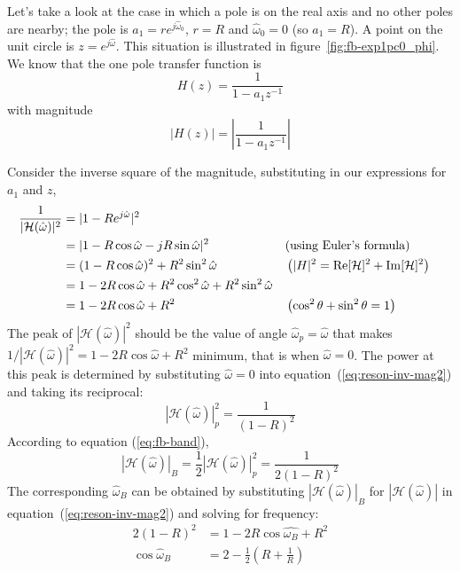 Let's take a look at the case in which a pole is on the real axis and
no other poles are nearby; the pole is $a_1=re^{j\hat{\omega}_0}$,
$r=R$ and $\hat{\omega}_0=0$ (so $a_1=R$). A point on the unit circle
is $z=e^{j\hat{\omega}}$. This situation is illustrated in
figure~\ref{fig:fb-exp1pc0_phi}.  We know that the one pole transfer
function is
\begin{equation}
H(z)=\frac{1}{1-a_1z^{-1}}
\end{equation}
with magnitude 
\begin{equation}
|H(z)|=\left|\frac{1}{1-a_1z^{-1}}\right|
\end{equation}

Consider the inverse square of the magnitude, substituting in our
expressions for $a_1$ and $z$,
\begin{align}
\frac{1}{|\mathcal{H}(\hat{\omega})|^2}
    &= |1-R e^{j\hat{\omega}}|^2 \notag\\
    &= |1 - R\cos\hat{\omega} - jR\sin\hat{\omega}|^2 
    &&\text{(using Euler's formula)}
    \notag\\
    &= (1 - R\cos\hat{\omega})^2 + R^2\sin^2\hat{\omega} 
    &&\left(|H|^2 = \operatorname{Re}[\mathcal{H}]^2 + \operatorname{Im}[\mathcal{H}]^2\right)
    \notag\\
    &= 1 - 2R\cos\hat{\omega} +R^2\cos^2\hat{\omega} +
       R^2\sin^2\hat{\omega} \notag\\ 
    &= 1-2R\cos\hat{\omega} + R^2
    &&\left(\cos^2\theta + \sin^2\theta = 1\right)
    \label{eq:reson-inv-mag2}
\end{align}
The peak of $|\mathcal{H}(\hat{\omega})|^2$ should be the value of
angle $\hat{\omega}_p=\hat{\omega}$ that makes
$1/|\mathcal{H}(\hat{\omega})|^2=1-2R\cos\hat{\omega} + R^2$ minimum,
that is when $\hat{\omega}=0$. The power at this peak is determined by
substituting $\hat{\omega}=0$ into equation~(\ref{eq:reson-inv-mag2})
and taking its reciprocal:
\begin{equation}
|\mathcal{H}(\hat{\omega})|^2_p=\frac{1}{(1-R)^2}
\end{equation}
According to equation (\ref{eq:fb-band}), 
\begin{equation}
|\mathcal{H}(\hat{\omega})|_B
  =\frac{1}{2}|\mathcal{H}(\hat{\omega})|^2_p=\frac{1}{2(1-R)^2}
\end{equation}
The corresponding $\hat{\omega}_B$ can be obtained by substituting
$|\mathcal{H}(\hat{\omega})|_B$ for $|\mathcal{H}(\hat{\omega})|$ in
equation~(\ref{eq:reson-inv-mag2}) and solving for frequency:
\begin{align}
2(1-R)^2 &= 1-2R\cos\hat{\omega_B}+R^2 \label{eq:fb-band2a}\\
\cos\hat{\omega}_B &= 2-\frac{1}{2}\left(R+\frac{1}{R}\right)
\label{eq:fb-band2b}
\end{align} 

